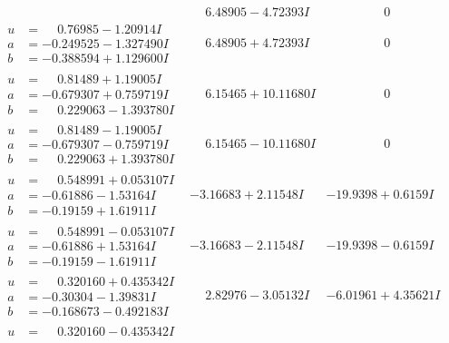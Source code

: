 \documentclass[1p]{elsarticle_modified}
\theoremstyle{definition}
\begin{document}
$$\begin{array}{c|c|c}
 & \phantom{-}6.48905 - 4.72393 I & \phantom{-0.000000 } 0 \\ \hline\begin{aligned}
u &= \phantom{-}0.76985 - 1.20914 I \\
a &= -0.249525 - 1.327490 I \\
b &= -0.388594 + 1.129600 I\end{aligned}
 & \phantom{-}6.48905 + 4.72393 I & \phantom{-0.000000 } 0 \\ \hline\begin{aligned}
u &= \phantom{-}0.81489 + 1.19005 I \\
a &= -0.679307 + 0.759719 I \\
b &= \phantom{-}0.229063 - 1.393780 I\end{aligned}
 & \phantom{-}6.15465 + 10.11680 I & \phantom{-0.000000 } 0 \\ \hline\begin{aligned}
u &= \phantom{-}0.81489 - 1.19005 I \\
a &= -0.679307 - 0.759719 I \\
b &= \phantom{-}0.229063 + 1.393780 I\end{aligned}
 & \phantom{-}6.15465 - 10.11680 I & \phantom{-0.000000 } 0 \\ \hline\begin{aligned}
u &= \phantom{-}0.548991 + 0.053107 I \\
a &= -0.61886 - 1.53164 I \\
b &= -0.19159 + 1.61911 I\end{aligned}
 & -3.16683 + 2.11548 I & -19.9398 + 0.6159 I \\ \hline\begin{aligned}
u &= \phantom{-}0.548991 - 0.053107 I \\
a &= -0.61886 + 1.53164 I \\
b &= -0.19159 - 1.61911 I\end{aligned}
 & -3.16683 - 2.11548 I & -19.9398 - 0.6159 I \\ \hline\begin{aligned}
u &= \phantom{-}0.320160 + 0.435342 I \\
a &= -0.30304 - 1.39831 I \\
b &= -0.168673 - 0.492183 I\end{aligned}
 & \phantom{-}2.82976 - 3.05132 I & -6.01961 + 4.35621 I \\ \hline\begin{aligned}
u &= \phantom{-}0.320160 - 0.435342 I \\

\end{aligned}
\end{array}$$
\end{document}
